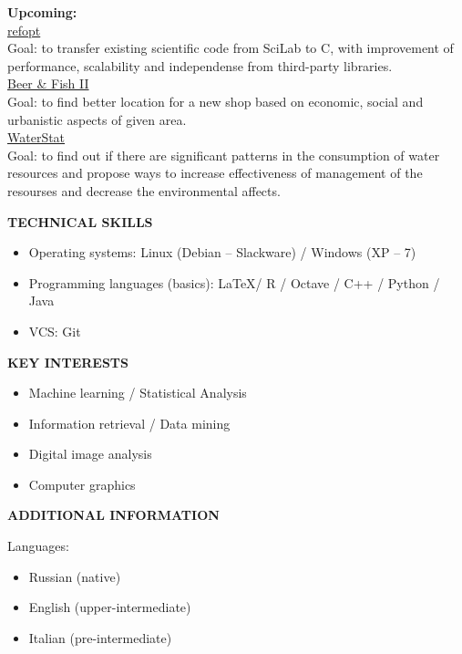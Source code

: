 \documentclass[a4paper,12pt,fullpage]{article}
\begin{document}
\textbf{Upcoming:}\\
\underline{refopt}\\
Goal: to transfer existing scientific code from SciLab to C, with improvement of performance, scalability and independense from third-party libraries.\\

\underline{Beer \& Fish II}\\
Goal: to find better location for a new shop based on economic, social and urbanistic aspects of given area.\\

\underline{WaterStat}\\
Goal: to find out if there are significant patterns in the consumption of water resources and propose ways to increase effectiveness of management of the resourses and decrease the environmental affects.\\
\begin{center}
	\textbf{TECHNICAL SKILLS}
\end{center}
\begin{itemize}
	\item Operating systems: Linux (Debian -- Slackware) / Windows (XP -- 7)
	\item Programming languages (basics): \LaTeX / R / Octave / C++ / Python / Java 
	\item VCS: Git
\end{itemize}

\begin{center}
	\textbf{KEY INTERESTS}
\end{center}
\begin{itemize}
	\item Machine learning / Statistical Analysis
	\item Information retrieval / Data mining
	\item Digital image analysis
	\item Computer graphics
\end{itemize}

\begin{center}
	\textbf{ADDITIONAL INFORMATION}
\end{center}
Languages: 
\begin{itemize}
	\item Russian (native)
	\item English (upper-intermediate)
	\item Italian (pre-intermediate)
\end{itemize}

\end{document}

